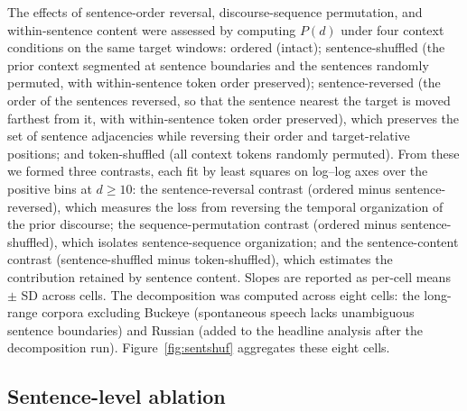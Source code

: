 \documentclass[11pt]{article}
\begin{document}
The effects of sentence-order reversal, discourse-sequence permutation, and within-sentence content were
assessed by computing $P(d)$ under four context conditions on the same target windows: ordered
(intact); sentence-shuffled (the prior context segmented at sentence boundaries and the sentences
randomly permuted, with within-sentence token order preserved); sentence-reversed (the order of the
sentences reversed, so that the sentence nearest the target is moved farthest from it, with
within-sentence token order preserved), which preserves the set of sentence adjacencies while
reversing their order and target-relative positions; and token-shuffled (all context tokens randomly
permuted). From these we formed three contrasts, each fit by least squares on log--log axes over the
positive bins at $d \geq 10$: the sentence-reversal contrast (ordered minus sentence-reversed), which
measures the loss from reversing the temporal organization of the prior discourse; the
sequence-permutation contrast (ordered minus sentence-shuffled), which isolates sentence-sequence
organization; and the sentence-content contrast (sentence-shuffled minus token-shuffled), which
estimates the contribution retained by sentence content. Slopes are reported
as per-cell means $\pm$ SD across cells. The decomposition was computed across eight cells: the
long-range corpora excluding Buckeye (spontaneous speech lacks unambiguous sentence boundaries) and
Russian (added to the headline analysis after the decomposition run). Figure~\ref{fig:sentshuf}
aggregates these eight cells.

\subsection{Sentence-level ablation}
\end{document}
